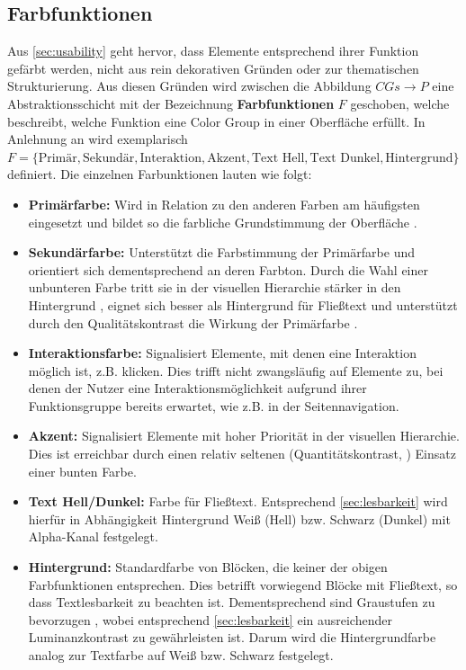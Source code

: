 \subsection{Farbfunktionen}
Aus \autoref{sec:usability} geht hervor, dass Elemente entsprechend ihrer Funktion gefärbt werden, nicht aus rein dekorativen Gründen oder zur thematischen Strukturierung. Aus diesen Gründen wird zwischen die Abbildung $CGs \to P$ eine Abstraktionsschicht mit der Bezeichnung \textbf{Farbfunktionen} $F$ geschoben, welche beschreibt, welche Funktion eine Color Group in einer Oberfläche erfüllt. In Anlehnung an \citep{google,  smashing} wird exemplarisch $F = \{\text{Primär}, \text{Sekundär}, \text{Interaktion}, \text{Akzent}, \text{Text Hell}, \text{Text Dunkel}, \text{Hintergrund}\}$ definiert. Die einzelnen Farbunktionen lauten wie folgt:
\begin{itemize}
	\item \textbf{Primärfarbe:} Wird in Relation zu den anderen Farben am häufigsten eingesetzt und bildet so die farbliche Grundstimmung der Oberfläche \citep{awwwards}.
	\item \textbf{Sekundärfarbe:} Unterstützt die Farbstimmung der Primärfarbe und orientiert sich dementsprechend an deren Farbton. Durch die Wahl einer unbunteren Farbe tritt sie in der visuellen Hierarchie stärker in den Hintergrund \citep{visual-hierarchy}, eignet sich besser als Hintergrund für Fließtext und unterstützt durch den Qualitätskontrast die Wirkung der Primärfarbe \citep{webdesign}.
	\item \textbf{Interaktionsfarbe:} Signalisiert Elemente, mit denen eine Interaktion möglich ist, z.B. klicken. Dies trifft nicht zwangsläufig auf Elemente zu, bei denen der Nutzer eine Interaktionsmöglichkeit aufgrund ihrer Funktionsgruppe bereits erwartet, wie z.B. in der Seitennavigation.
	\item \textbf{Akzent:} Signalisiert Elemente mit hoher Priorität in der visuellen Hierarchie. Dies ist erreichbar durch einen relativ seltenen (Quantitätskontrast, \citep{webdesign}) Einsatz einer bunten \citep{visual-hierarchy} Farbe.
	\item \textbf{Text Hell/Dunkel:} Farbe für Fließtext. Entsprechend \autoref{sec:lesbarkeit} wird hierfür in Abhängigkeit Hintergrund Weiß (Hell) bzw. Schwarz (Dunkel) mit Alpha-Kanal festgelegt.
	\item \textbf{Hintergrund:} Standardfarbe von Blöcken, die keiner der obigen Farbfunktionen entsprechen. Dies betrifft vorwiegend Blöcke mit Fließtext, so dass Textlesbarkeit zu beachten ist. Dementsprechend sind Graustufen zu bevorzugen \citep{webx0}, wobei entsprechend \autoref{sec:lesbarkeit} ein ausreichender Luminanzkontrast zu gewährleisten ist. Darum wird die Hintergrundfarbe analog zur Textfarbe auf Weiß bzw. Schwarz festgelegt.
\end{itemize}

